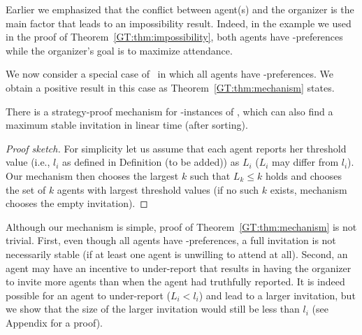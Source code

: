 
Earlier we emphasized that the conflict between agent(s) and the organizer is the main factor that leads to an impossibility result. 
Indeed, in the example we used in the proof of Theorem~\ref{GT:thm:impossibility}, both agents have \DEC-preferences while the organizer's goal is to maximize attendance.

We now consider a special case of \ASIP\ in which all agents have \INC-preferences.
We obtain a positive result in this case as Theorem~\ref{GT:thm:mechanism} states. 

\begin{theorem} \label{GT:thm:mechanism}
	There is a strategy-proof mechanism for \INC-instances of \ASIP, which can also find a maximum stable invitation in linear time (after sorting). 
\end{theorem}
\begin{proof}[Proof sketch]
For simplicity let us assume that each agent reports her threshold value (i.e., $l_i$ as defined in Definition (to be added)) as $L_i$ ($L_i$ may differ from $l_i$). 
Our mechanism then chooses the largest $k$ such that $L_k \leq k$ holds and chooses the set of $k$ agents with largest threshold values (if no such $k$ exists, mechanism chooses the empty invitation). 
\end{proof}
	Although our mechanism is simple, proof of Theorem~\ref{GT:thm:mechanism} is not trivial. First, even though all agents have \INC-preferences, a full invitation is not necessarily stable (if at least one agent is unwilling to attend at all). Second, an agent may have an incentive to under-report that results in having the organizer to invite more agents than when the agent had truthfully reported. It is indeed possible for an agent to under-report ($L_i < l_i$) and lead to a larger invitation, but we show that the size of the larger invitation would still be less than $l_i$ (see Appendix for a proof). 


